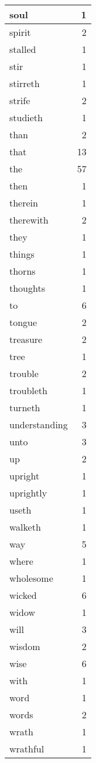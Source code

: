 \begin{center}
\begin{longtable}{l|r}
soul & 1\\ \hline 
spirit & 2\\ \hline 
stalled & 1\\ \hline 
stir & 1\\ \hline 
stirreth & 1\\ \hline 
strife & 2\\ \hline 
studieth & 1\\ \hline 
than & 2\\ \hline 
that & 13\\ \hline 
the & 57\\ \hline 
then & 1\\ \hline 
therein & 1\\ \hline 
therewith & 2\\ \hline 
they & 1\\ \hline 
things & 1\\ \hline 
thorns & 1\\ \hline 
thoughts & 1\\ \hline 
to & 6\\ \hline 
tongue & 2\\ \hline 
treasure & 2\\ \hline 
tree & 1\\ \hline 
trouble & 2\\ \hline 
troubleth & 1\\ \hline 
turneth & 1\\ \hline 
understanding & 3\\ \hline 
unto & 3\\ \hline 
up & 2\\ \hline 
upright & 1\\ \hline 
uprightly & 1\\ \hline 
useth & 1\\ \hline 
walketh & 1\\ \hline 
way & 5\\ \hline 
where & 1\\ \hline 
wholesome & 1\\ \hline 
wicked & 6\\ \hline 
widow & 1\\ \hline 
will & 3\\ \hline 
wisdom & 2\\ \hline 
wise & 6\\ \hline 
with & 1\\ \hline 
word & 1\\ \hline 
words & 2\\ \hline 
wrath & 1\\ \hline 
wrathful & 1\\ \hline 
\end{longtable}  
\end{center}  


